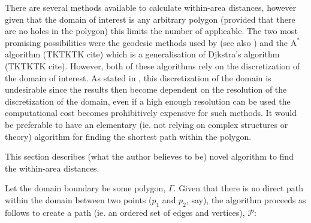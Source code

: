 There are several methods available to calculate within-area distances, however given that the domain of interest is any arbitrary polygon (provided that there are no holes in the polygon) this limits the number of applicable. The two most promising possibilities were the geodesic methods used by \cite{wangranalli} (see also ) and the $\text{A}^*$ algorithm (TKTKTK cite) which is a generalisation of Djkstra's algorithm (TKTKTK cite). However, both of these algorithms rely on the discretization of the domain of interest. As stated in , this discretization of the domain is undesirable since the results then become dependent on the resolution of the discretization of the domain, even if a high enough resolution can be used the computational cost becomes prohibitively expensive for such methods. It would be preferable to have an elementary (ie. not relying on complex structures or theory) algorithm for finding the shortest path within the polygon.

This section describes (what the author believes to be) novel algorithm to find the within-area distances.

Let the domain boundary be some polygon, $\Gamma$. Given that there is no direct path within the domain between two points ($p_1$ and $p_2$, say), the algorithm proceeds as follows to create a path (ie. an ordered set of edges and vertices), $\mathcal{P}$:

